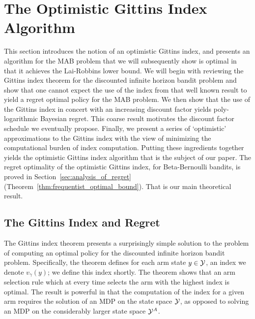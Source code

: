 \section{The Optimistic Gittins Index Algorithm} \label{sec:gittins_and_approx}

This section introduces the notion of an optimistic Gittins index, and presents an algorithm for the MAB problem that we will subsequently show is optimal in that it achieves the Lai-Robbins lower bound. We will begin with reviewing the Gittins index theorem for the discounted infinite horizon bandit problem and show that one cannot expect the use of the index from that well known result to yield a regret optimal policy for the MAB problem. We then show that the use of the Gittins index in concert with an increasing discount factor yields poly-logarithmic Bayesian regret. This coarse result motivates the discount factor schedule we eventually propose. Finally, we present a series of `optimistic' approximations to the Gittins index with the view of minimizing the computational burden of index computation. Putting these ingredients together yields the optimistic Gittins index algorithm that is the subject of our paper. The regret optimality of the optimistic Gittins index, for Beta-Bernoulli bandits, is proved in Section~\ref{sec:analysis_of_regret} (Theorem~\ref{thm:frequentist_optimal_bound}). That is our main theoretical result. 

\subsection{The Gittins Index and Regret}

The Gittins index theorem presents a surprisingly simple solution to the problem of computing an optimal policy for the discounted infinite horizon bandit problem. Specifically, the theorem defines for each arm state $y \in \mathcal Y$, an index we denote $v_\gamma(y)$; we define this index shortly. The theorem shows that an arm selection rule which at every time selects the arm with the highest index is optimal. The result is powerful in that the computation of the index for a given arm requires the solution of an MDP on the state space $\mathcal Y$, as opposed to solving an MDP on the considerably larger state space $\mathcal Y^A$. 

